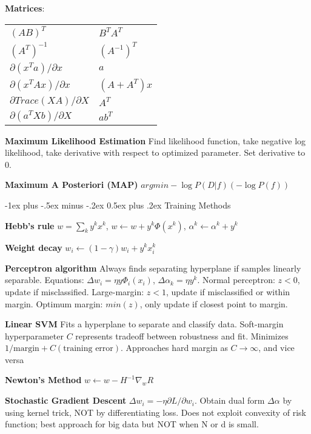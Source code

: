 \documentclass[10pt,landscape]{article}
\makeatletter
\renewcommand{\section}{\@startsection{section}{1}{0mm}%
                                {-1ex plus -.5ex minus -.2ex}%
                                {0.5ex plus .2ex}%
                                {\normalfont\large\bfseries}}
\makeatother
\begin{document}
\begin{multicols}{3}
\textbf{Matrices}:

\begin{tabular}{@{}ll@{}}
$(AB)^T$                            & $B^T A^T$ \\
$(A^T)^{-1}$                        & $(A^{-1})^T$ \\
$\partial(x^T a) / \partial x$      & $a$ \\
$\partial(x^T Ax) / \partial x$     & $(A + A^T) x$ \\
$\partial Trace(XA) / \partial X$   & $A^T$ \\
$\partial(a^T Xb) / \partial X$     & $ab^T$
\end{tabular}

\textbf{Maximum Likelihood Estimation} Find likelihood function, take negative log likelihood, take derivative with respect to optimized parameter. Set derivative to 0.

\textbf{Maximum A Posteriori (MAP)} $argmin -\log P(D|f) (-\log P(f))$


\section{Training Methods}

\textbf{Hebb's rule} $w = \sum_k y^k x^k$, $w \leftarrow w + y^k \Phi(x^k)$, $\alpha^k \leftarrow \alpha^k + y^k$

\textbf{Weight decay} $w_i \leftarrow (1 - \gamma) w_i + y^k x_i^k$

\textbf{Perceptron algorithm} Always finds separating hyperplane if samples linearly separable. Equations: $\Delta w_i = \eta y \Phi_i(x_i)$, $\Delta \alpha_k = \eta y^k$. Normal perceptron: $z < 0$, update if misclassified. Large-margin: $z < 1$, update if misclassified or within margin. Optimum margin: $min(z)$, only update if closest point to margin.

\textbf{Linear SVM} Fits a hyperplane to separate and classify data. Soft-margin hyperparameter $C$ represents tradeoff between robustness and fit. Minimizes $1/\text{margin} + C(\text{training error})$. Approaches hard margin as $C\rightarrow\infty$, and vice versa

\textbf{Newton's Method} $w \leftarrow w - H^{-1}\nabla_w R$

\textbf{Stochastic Gradient Descent} $\Delta w_i = -\eta \partial L / \partial w_i$. Obtain dual form $\Delta \alpha$ by using kernel trick, NOT by differentiating loss. Does not exploit convexity of risk function; best approach for big data but NOT when N or d is small.


\end{multicols}
\end{document}
